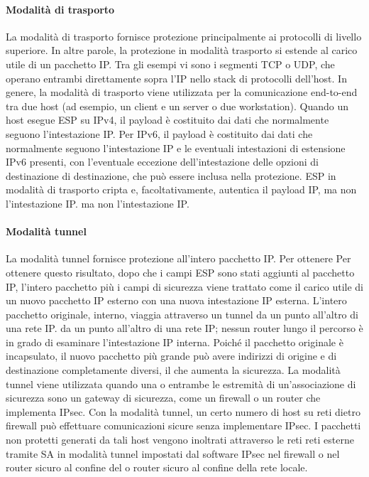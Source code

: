 \paragraph{Modalità di trasporto} La modalità di trasporto fornisce protezione principalmente ai protocolli di livello superiore. In altre parole, la protezione in modalità trasporto si estende al carico utile di un pacchetto IP. Tra gli esempi vi sono i segmenti TCP o UDP, che operano entrambi direttamente sopra l'IP nello stack di protocolli dell'host. In genere, la modalità di trasporto viene utilizzata per la comunicazione end-to-end tra due host (ad esempio, un client e un server o due workstation). Quando un host esegue ESP su IPv4, il payload è costituito dai dati che normalmente seguono l'intestazione IP. Per IPv6, il payload è costituito dai dati che normalmente seguono l'intestazione IP e le eventuali intestazioni di estensione IPv6 presenti, con l'eventuale eccezione dell'intestazione delle opzioni di destinazione di destinazione, che può essere inclusa nella protezione. ESP in modalità di trasporto cripta e, facoltativamente, autentica il payload IP, ma non l'intestazione IP. ma non l'intestazione IP.

\singlespacing

\paragraph{Modalità tunnel} La modalità tunnel fornisce protezione all'intero pacchetto IP. Per ottenere
Per ottenere questo risultato, dopo che i campi ESP sono stati aggiunti al pacchetto IP, l'intero pacchetto più i campi 
di sicurezza viene trattato come il carico utile di un nuovo pacchetto IP esterno con una nuova intestazione IP esterna.
L'intero pacchetto originale, interno, viaggia attraverso un tunnel da un punto all'altro di una rete IP.
da un punto all'altro di una rete IP; nessun router lungo il percorso è in grado di esaminare l'intestazione IP interna.
Poiché il pacchetto originale è incapsulato, il nuovo pacchetto più grande può avere indirizzi di origine e di destinazione completamente diversi, il che aumenta la sicurezza. La modalità tunnel viene utilizzata quando una o entrambe le estremità di un'associazione di sicurezza sono un gateway di sicurezza, come un firewall o un router che implementa IPsec. Con la modalità tunnel, un certo numero di host su reti dietro firewall può effettuare comunicazioni sicure senza implementare IPsec. I pacchetti non protetti generati da tali host vengono inoltrati attraverso le reti reti esterne tramite SA in modalità tunnel impostati dal software IPsec nel firewall o nel router sicuro al confine del o router sicuro al confine della rete locale. 

